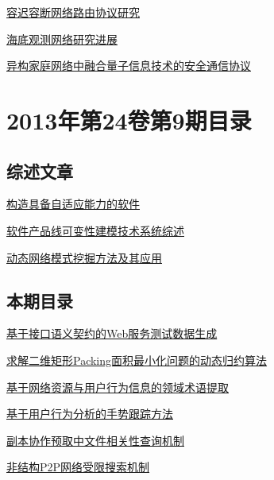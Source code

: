 \documentclass[a4paper]{article}
\begin{document}
\href{http://www.jos.org.cn/ch/reader/download_pdf.aspx?file_no=13015&year_id=2013&quarter_id=S1&falg=1}{容迟容断网络路由协议研究}

\href{http://www.jos.org.cn/ch/reader/download_pdf.aspx?file_no=13016&year_id=2013&quarter_id=S1&falg=1}{海底观测网络研究进展}

\href{http://www.jos.org.cn/ch/reader/download_pdf.aspx?file_no=13017&year_id=2013&quarter_id=S1&falg=1}{异构家庭网络中融合量子信息技术的安全通信协议}


\section{\textbf{2013年第24卷第9期目录}}
\subsection{综述文章}
\href{http://www.jos.org.cn/ch/reader/download_pdf.aspx?file_no=4432&year_id=2013&quarter_id=9&falg=1}{构造具备自适应能力的软件}

\href{http://www.jos.org.cn/ch/reader/download_pdf.aspx?file_no=4433&year_id=2013&quarter_id=9&falg=1}{软件产品线可变性建模技术系统综述}

\href{http://www.jos.org.cn/ch/reader/download_pdf.aspx?file_no=4439&year_id=2013&quarter_id=9&falg=1}{动态网络模式挖掘方法及其应用}

\subsection{本期目录}
\href{http://www.jos.org.cn/ch/reader/download_pdf.aspx?file_no=4366&year_id=2013&quarter_id=9&falg=1}{基于接口语义契约的Web服务测试数据生成}

\href{http://www.jos.org.cn/ch/reader/download_pdf.aspx?file_no=4404&year_id=2013&quarter_id=9&falg=1}{求解二维矩形Packing面积最小化问题的动态归约算法}

\href{http://www.jos.org.cn/ch/reader/download_pdf.aspx?file_no=4358&year_id=2013&quarter_id=9&falg=1}{基于网络资源与用户行为信息的领域术语提取}

\href{http://www.jos.org.cn/ch/reader/download_pdf.aspx?file_no=4368&year_id=2013&quarter_id=9&falg=1}{基于用户行为分析的手势跟踪方法}

\href{http://www.jos.org.cn/ch/reader/download_pdf.aspx?file_no=4347&year_id=2013&quarter_id=9&falg=1}{副本协作预取中文件相关性查询机制}

\href{http://www.jos.org.cn/ch/reader/download_pdf.aspx?file_no=4359&year_id=2013&quarter_id=9&falg=1}{非结构P2P网络受限搜索机制}
\end{document}
